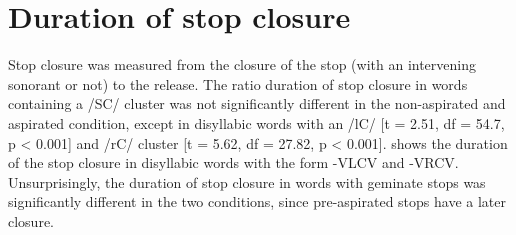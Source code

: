 \documentclass[11pt,a4paper,oneside,openany]{memoir}\usepackage[]{graphicx}\usepackage[]{color}
\begin{document}
\section{Duration of stop closure}
\label{s:durstopclos}



Stop closure was measured from the closure of the stop (with an intervening sonorant or not) to the release.
The ratio duration of stop closure in words containing a /SC/ cluster was not significantly different in the non-aspirated and aspirated condition, except in disyllabic words with an /lC/ [t = 2.51, df = 54.7, p < 0.001] and /rC/ cluster [t = 5.62, df = 27.82, p < 0.001].
 shows the duration of the stop closure in disyllabic words with the form -VLCV and -VRCV.
Unsurprisingly, the duration of stop closure in words with geminate stops was significantly different in the two conditions, since pre-aspirated stops have a later closure.
\end{document}

